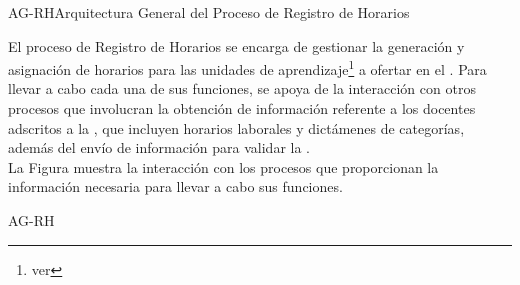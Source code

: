 


\begin{Arquitectura}{AG-RH}{Arquitectura General del Proceso de Registro de Horarios} {
		
		El proceso de Registro de Horarios se encarga de gestionar la generación y asignación de horarios para las unidades de aprendizaje\footnote{ver } a ofertar en el . Para llevar a cabo cada una de sus funciones, se apoya de la interacción con otros procesos que involucran la obtención de información referente a los docentes adscritos a la , que incluyen horarios laborales y dictámenes de categorías, además del envío de información para validar la . \\
		
		
		
		 
		\noindent La Figura  muestra la interacción con los procesos que proporcionan la información necesaria para llevar a cabo sus funciones.
		
		
	}{AG-RH}


\end{Arquitectura}

